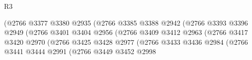\begin{lexlean}{R3}
\begin{coremodule}
                                                  (@2766
                                                    @3377
                                                    @3380
                                                    @2935
                                                    (@2766
                                                      @3385
                                                      @3388
                                                      @2942
                                                      (@2766
                                                        @3393
                                                        @3396
                                                        @2949
                                                        (@2766
                                                          @3401
                                                          @3404
                                                          @2956
                                                          (@2766
                                                            @3409
                                                            @3412
                                                            @2963
                                                            (@2766
                                                              @3417
                                                              @3420
                                                              @2970
                                                              (@2766
                                                                @3425
                                                                @3428
                                                                @2977
                                                                (@2766
                                                                  @3433
                                                                  @3436
                                                                  @2984
                                                                  (@2766
                                                                    @3441
                                                                    @3444
                                                                    @2991
                                                                    (@2766
                                                                      @3449
                                                                      @3452
                                                                      @2998

\end{coremodule}
\end{lexlean}
